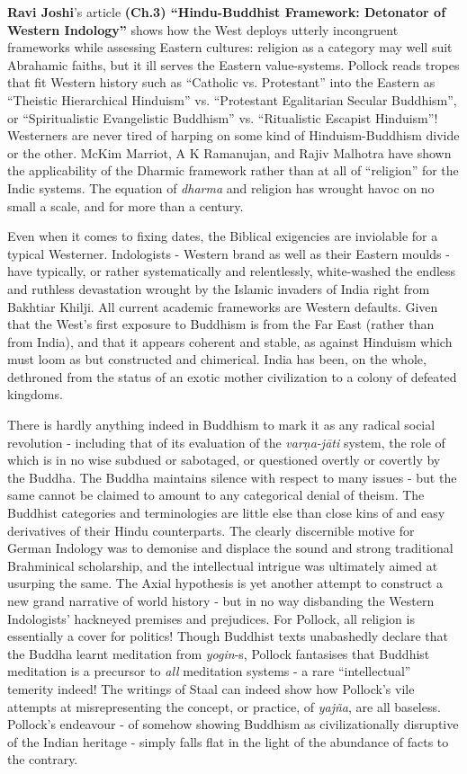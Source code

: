 \textbf{Ravi Joshi}’s article \textbf{(Ch.3) “Hindu-Buddhist Framework: Detonator of Western Indology”} shows how the West deploys utterly incongruent frameworks while assessing Eastern cultures: religion as a category may well suit Abrahamic faiths, but it ill serves the Eastern value-systems. Pollock reads tropes that fit Western history such as “Catholic vs. Protestant” into the Eastern as “Theistic Hierarchical Hinduism'' vs. ``Protestant Egalitarian Secular Buddhism”, or “Spiritualistic Evangelistic Buddhism” vs. “Ritualistic Escapist Hinduism''! Westerners are never tired of harping on some kind of Hinduism-\break Buddhism divide or the other. McKim Marriot, A K Ramanujan, and Rajiv Malhotra have shown the applicability of the Dharmic framework rather than at all of “religion” for the Indic systems. The equation of \textit{dharma} and religion has wrought havoc on no small a scale, and for more than a century.

Even when it comes to fixing dates, the Biblical exigencies are inviolable for a typical Westerner. Indologists - Western brand as well as their Eastern moulds - have typically, or rather systematically and relentlessly, white-washed the endless and ruthless devastation wrought by the Islamic invaders of India right from Bakhtiar Khilji. All current academic frameworks are Western defaults. Given that the West's first exposure to Buddhism is from the Far East (rather than from India), and that it appears coherent and stable, as against Hinduism which must loom as but constructed and chimerical. India has been, on the whole, dethroned from the status of an exotic mother civilization to a colony of defeated kingdoms.

There is hardly anything indeed in Buddhism to mark it as any radical social revolution - including that of its evaluation of the \textit{varṇa-jāti} system, the role of which is in no wise subdued or sabotaged, or questioned overtly or covertly by the Buddha. The Buddha maintains silence with respect to many issues - but the same cannot be claimed to amount to any categorical denial of theism. The Buddhist categories and terminologies are little else than close kins of and easy derivatives of their Hindu counterparts. The clearly discernible motive for German Indology was to demonise and displace the sound and strong traditional Brahminical scholarship, and the intellectual intrigue was ultimately aimed at usurping the same. The Axial hypothesis is yet another attempt to construct a new grand narrative of world history - but in no way disbanding the Western Indologists’ hackneyed premises and prejudices. For Pollock, all religion is essentially a cover for politics! Though Buddhist texts unabashedly declare that the Buddha learnt meditation from \textit{yogin}-s, Pollock fantasises that Buddhist meditation is a precursor to \textit{all} meditation systems - a rare “intellectual” temerity indeed! The writings of Staal can indeed show how Pollock’s vile attempts at misrepresenting the concept, or practice, of \textit{yajña}, are all baseless. Pollock’s endeavour - of somehow showing Buddhism as civilizationally disruptive of the Indian heritage - simply falls flat in the light of the abundance of facts to the contrary.


